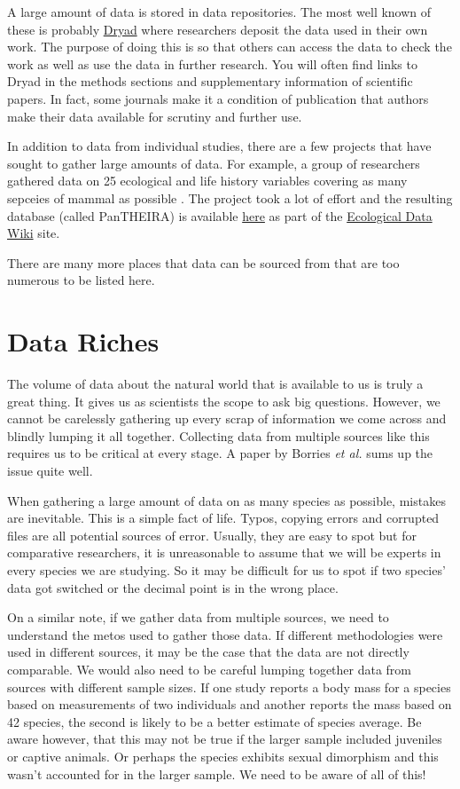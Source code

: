 \documentclass[
]{book}
\begin{document}
A large amount of data is stored in data repositories. The most well known of these is probably \href{https://datadryad.org/stash/}{Dryad} where researchers deposit the data used in their own work. The purpose of doing this is so that others can access the data to check the work as well as use the data in further research. You will often find links to Dryad in the methods sections and supplementary information of scientific papers. In fact, some journals make it a condition of publication that authors make their data available for scrutiny and further use.

In addition to data from individual studies, there are a few projects that have sought to gather large amounts of data. For example, a group of researchers gathered data on 25 ecological and life history variables covering as many sepceies of mammal as possible \citep{Jones09}. The project took a lot of effort and the resulting database (called PanTHEIRA) is available \href{https://ecologicaldata.org/wiki/pantheria}{here} as part of the \href{https://ecologicaldata.org/home}{Ecological Data Wiki} site.

There are many more places that data can be sourced from that are too numerous to be listed here.

\hypertarget{data-riches}{%
\section{Data Riches}\label{data-riches}}

The volume of data about the natural world that is available to us is truly a great thing. It gives us as scientists the scope to ask big questions. However, we cannot be carelessly gathering up every scrap of information we come across and blindly lumping it all together. Collecting data from multiple sources like this requires us to be critical at every stage. A paper by Borries \emph{et al.} \citeyearpar{Borries16} sums up the issue quite well.

When gathering a large amount of data on as many species as possible, mistakes are inevitable. This is a simple fact of life. Typos, copying errors and corrupted files are all potential sources of error. Usually, they are easy to spot but for comparative researchers, it is unreasonable to assume that we will be experts in every species we are studying. So it may be difficult for us to spot if two species' data got switched or the decimal point is in the wrong place.

On a similar note, if we gather data from multiple sources, we need to understand the metos used to gather those data. If different methodologies were used in different sources, it may be the case that the data are not directly comparable. We would also need to be careful lumping together data from sources with different sample sizes. If one study reports a body mass for a species based on measurements of two individuals and another reports the mass based on 42 species, the second is likely to be a better estimate of species average. Be aware however, that this may not be true if the larger sample included juveniles or captive animals. Or perhaps the species exhibits sexual dimorphism and this wasn't accounted for in the larger sample. We need to be aware of all of this!
\end{document}
